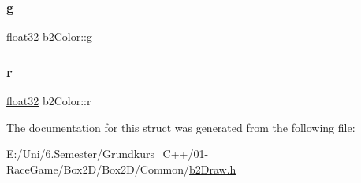 \mbox{\label{structb2_color_a241c742352403ec456b51ac5f2abe7d9}} 
\subsubsection{\texorpdfstring{g}{g}}
{\footnotesize\ttfamily \mbox{\hyperlink{b2_settings_8h_aacdc525d6f7bddb3ae95d5c311bd06a1}{float32}} b2\+Color\+::g}

\mbox{\label{structb2_color_a9ab6c9a910caee177d96980b74ffb00b}} 
\subsubsection{\texorpdfstring{r}{r}}
{\footnotesize\ttfamily \mbox{\hyperlink{b2_settings_8h_aacdc525d6f7bddb3ae95d5c311bd06a1}{float32}} b2\+Color\+::r}



The documentation for this struct was generated from the following file\+:\begin{DoxyCompactItemize}
\item 
E\+:/\+Uni/6.\+Semester/\+Grundkurs\+\_\+\+C++/01-\/\+Race\+Game/\+Box2\+D/\+Box2\+D/\+Common/\mbox{\hyperlink{b2_draw_8h}{b2\+Draw.\+h}}\end{DoxyCompactItemize}
